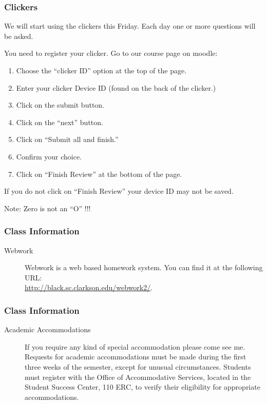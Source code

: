 \begin{frame}
  \frametitle{Clickers}

  We will start using the clickers this Friday. Each day one or more
  questions will be asked.

  You need to register your clicker. Go to our course page on moodle:
  \begin{enumerate}
  \item Choose the ``clicker ID'' option at the top of the page.
  \item Enter your clicker Device ID (found on the back of the
    clicker.)
  \item Click on the submit button.
  \item Click on the ``next'' button.
  \item Click on ``Submit all and finish.''
  \item Confirm your choice.
  \item Click on ``Finish Review'' at the bottom of the page.
  \end{enumerate}

  If you do not click on ``Finish Review'' your device ID may not be saved.

  Note: Zero is not an ``O''  !!!
  
\end{frame}


\begin{frame}
  \frametitle{Class Information}

\begin{description}
  \item[Webwork] Webwork is a web based homework system. You can find
    it at the following URL: \\
    \url{http://black.sc.clarkson.edu/webwork2/}.
\end{description}

\end{frame}


\begin{frame}
  \frametitle{Class Information}

\begin{description}
  \item[Academic Accommodations] If you require any kind of special
    accommodation please come see me.  Requests for academic
    accommodations must be made during the first three weeks of the
    semester, except for unusual circumstances.  Students must
    register with the Office of Accommodative Services, located in the
    Student Success Center, 110 ERC, to verify their eligibility for
    appropriate accommodations.


\end{description}


\end{frame}


